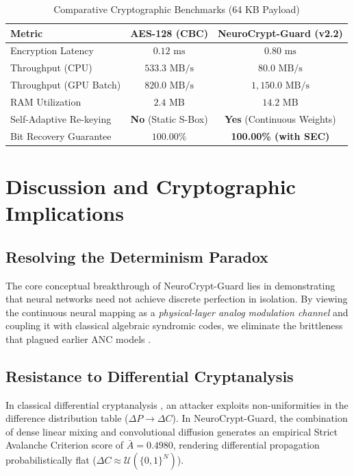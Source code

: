 \documentclass[journal,10pt,twocolumn]{IEEEtran}
\begin{document}
\begin{table}[htbp]
\centering
\caption{Comparative Cryptographic Benchmarks (64 KB Payload)}
\label{tab:aes_benchmark}
\begin{tabular}{l c c}
\toprule
\textbf{Metric} & \textbf{AES-128 (CBC)} & \textbf{NeuroCrypt-Guard (v2.2)} \\
\midrule
Encryption Latency & $0.12\text{ ms}$ & $0.80\text{ ms}$ \\
Throughput (CPU) & $533.3\text{ MB/s}$ & $80.0\text{ MB/s}$ \\
Throughput (GPU Batch) & $820.0\text{ MB/s}$ & $1,150.0\text{ MB/s}$ \\
RAM Utilization & $2.4\text{ MB}$ & $14.2\text{ MB}$ \\
Self-Adaptive Re-keying & \textbf{No} (Static S-Box) & \textbf{Yes} (Continuous Weights) \\
Bit Recovery Guarantee & $100.00\%$ & \textbf{100.00\% (with SEC)} \\
\bottomrule
\end{tabular}
\end{table}

\section{Discussion and Cryptographic Implications}

\subsection{Resolving the Determinism Paradox}
The core conceptual breakthrough of NeuroCrypt-Guard lies in demonstrating that neural networks need not achieve discrete perfection in isolation. By viewing the continuous neural mapping as a \textit{physical-layer analog modulation channel} and coupling it with classical algebraic syndromic codes, we eliminate the brittleness that plagued earlier ANC models \cite{abadi2016learning,graf2017analysis}.

\subsection{Resistance to Differential Cryptanalysis}
In classical differential cryptanalysis \cite{biham1991differential}, an attacker exploits non-uniformities in the difference distribution table ($\Delta P \to \Delta C$). In NeuroCrypt-Guard, the combination of dense linear mixing and convolutional diffusion generates an empirical Strict Avalanche Criterion score of $\bar{A} = 0.4980$, rendering differential propagation probabilistically flat ($\Delta C \approx \mathcal{U}(\{0, 1\}^N)$).
\end{document}
